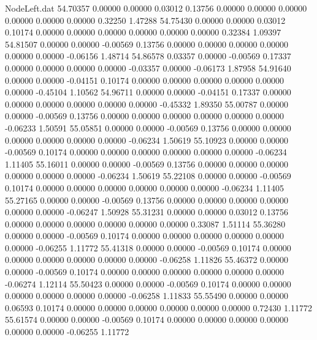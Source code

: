 \begin{filecontents}{NodeLeft.dat}
  54.70357    0.00000    0.00000     0.03012    0.13756    0.00000    0.00000    0.00000    0.00000    0.00000    0.00000    0.32250    1.47288
  54.75430    0.00000    0.00000     0.03012    0.10174    0.00000    0.00000    0.00000    0.00000    0.00000    0.00000    0.32384    1.09397
  54.81507    0.00000    0.00000    -0.00569    0.13756    0.00000    0.00000    0.00000    0.00000    0.00000    0.00000   -0.06156    1.48714
  54.86578    0.03357    0.00000    -0.00569    0.17337    0.00000    0.00000    0.00000    0.00000   -0.03357    0.00000   -0.06173    1.87958
  54.91640    0.00000    0.00000    -0.04151    0.10174    0.00000    0.00000    0.00000    0.00000    0.00000    0.00000   -0.45104    1.10562
  54.96711    0.00000    0.00000    -0.04151    0.17337    0.00000    0.00000    0.00000    0.00000    0.00000    0.00000   -0.45332    1.89350
  55.00787    0.00000    0.00000    -0.00569    0.13756    0.00000    0.00000    0.00000    0.00000    0.00000    0.00000   -0.06233    1.50591
  55.05851    0.00000    0.00000    -0.00569    0.13756    0.00000    0.00000    0.00000    0.00000    0.00000    0.00000   -0.06234    1.50619
  55.10923    0.00000    0.00000    -0.00569    0.10174    0.00000    0.00000    0.00000    0.00000    0.00000    0.00000   -0.06234    1.11405
  55.16011    0.00000    0.00000    -0.00569    0.13756    0.00000    0.00000    0.00000    0.00000    0.00000    0.00000   -0.06234    1.50619
  55.22108    0.00000    0.00000    -0.00569    0.10174    0.00000    0.00000    0.00000    0.00000    0.00000    0.00000   -0.06234    1.11405
  55.27165    0.00000    0.00000    -0.00569    0.13756    0.00000    0.00000    0.00000    0.00000    0.00000    0.00000   -0.06247    1.50928
  55.31231    0.00000    0.00000     0.03012    0.13756    0.00000    0.00000    0.00000    0.00000    0.00000    0.00000    0.33087    1.51114
  55.36280    0.00000    0.00000    -0.00569    0.10174    0.00000    0.00000    0.00000    0.00000    0.00000    0.00000   -0.06255    1.11772
  55.41318    0.00000    0.00000    -0.00569    0.10174    0.00000    0.00000    0.00000    0.00000    0.00000    0.00000   -0.06258    1.11826
  55.46372    0.00000    0.00000    -0.00569    0.10174    0.00000    0.00000    0.00000    0.00000    0.00000    0.00000   -0.06274    1.12114
  55.50423    0.00000    0.00000    -0.00569    0.10174    0.00000    0.00000    0.00000    0.00000    0.00000    0.00000   -0.06258    1.11833
  55.55490    0.00000    0.00000     0.06593    0.10174    0.00000    0.00000    0.00000    0.00000    0.00000    0.00000    0.72430    1.11772
  55.61574    0.00000    0.00000    -0.00569    0.10174    0.00000    0.00000    0.00000    0.00000    0.00000    0.00000   -0.06255    1.11772

\end{filecontents}
